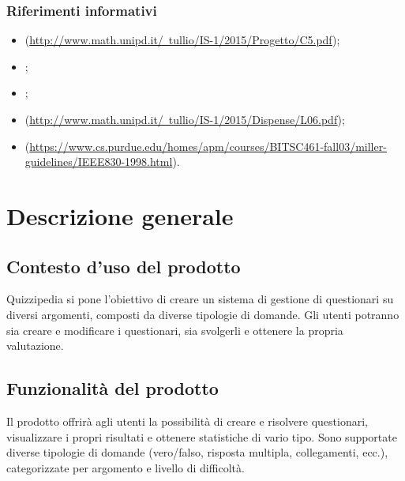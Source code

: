 \documentclass[a4paper, titlepage]{article}
\begin{document}
\subsubsection{Riferimenti informativi}
\begin{itemize}
\item {}  (\href{http://www.math.unipd.it/~tullio/IS-1/2015/Progetto/C5.pdf}{http://www.math.unipd.it/~tullio/IS-1/2015/Progetto/C5.pdf});

\item {} \SdFdoc;

\item {} \Gldoc;

\item {}  (\href{http://www.math.unipd.it/~tullio/IS-1/2015/Dispense/L06.pdf}{http://www.math.unipd.it/~tullio/IS-1/2015/Dispense/L06.pdf});

\item {}  (\href{https://www.cs.purdue.edu/homes/apm/courses/BITSC461-fall03/miller-guidelines/IEEE830-1998.html}{https://www.cs.purdue.edu/homes/apm/courses/BITSC461-fall03/miller-guidelines/IEEE830-1998.html}).

\end{itemize}

\newpage

\section{Descrizione generale}
\subsection{Contesto d'uso del prodotto}
Quizzipedia si pone l'obiettivo di creare un sistema di gestione di questionari su diversi argomenti, composti da diverse tipologie di domande. Gli utenti potranno sia creare e modificare i questionari, sia svolgerli e ottenere la propria valutazione.

\subsection{Funzionalità del prodotto}
Il prodotto offrirà agli utenti la possibilità di creare e risolvere questionari, visualizzare i propri risultati e ottenere statistiche di vario tipo. 
Sono supportate diverse tipologie di domande (vero/falso, risposta multipla, collegamenti, ecc.), categorizzate per argomento e livello di difficoltà. 
\end{document}
